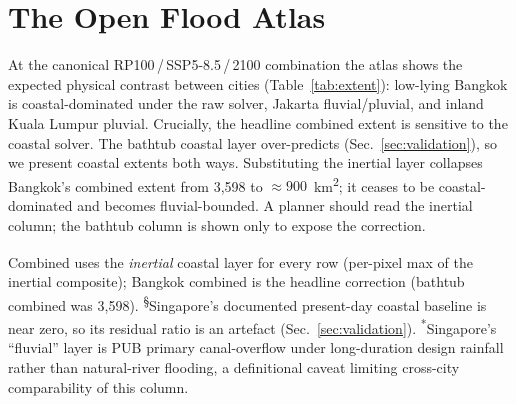 \documentclass[conference]{IEEEtran}
\begin{document}
\section{The Open Flood Atlas}
At the canonical RP100\,/\,SSP5-8.5\,/\,2100 combination the atlas shows the expected physical contrast between cities (Table~\ref{tab:extent}): low-lying Bangkok is coastal-dominated under the raw solver, Jakarta fluvial/pluvial, and inland Kuala Lumpur pluvial. Crucially, the headline combined extent is sensitive to the coastal solver. The bathtub coastal layer over-predicts (Sec.~\ref{sec:validation}), so we present coastal extents both ways. Substituting the inertial layer collapses Bangkok's combined extent from 3{,}598 to ${\approx}900$~km\textsuperscript{2}; it ceases to be coastal-dominated and becomes fluvial-bounded. A planner should read the inertial column; the bathtub column is shown only to expose the correction.

\begin{table}[t]
\centering
\caption{Combined flood extent at RP100, SSP5-8.5\,/\,2100 (km\textsuperscript{2}). Coastal shown as bathtub~$\rightarrow$~inertial.}
\label{tab:extent}
\small
\setlength{\tabcolsep}{4pt}

\vspace{2pt}
\footnotesize
\textsuperscript{\ddag}Combined uses the \emph{inertial} coastal layer for every row (per-pixel max of the inertial composite); Bangkok combined is the headline correction (bathtub combined was 3{,}598). \textsuperscript{\S}Singapore's documented present-day coastal baseline is near zero, so its residual ratio is an artefact (Sec.~\ref{sec:validation}). \textsuperscript{*}Singapore's ``fluvial'' layer is PUB primary canal-overflow under long-duration design rainfall rather than natural-river flooding, a definitional caveat limiting cross-city comparability of this column.
\end{table}
\end{document}
